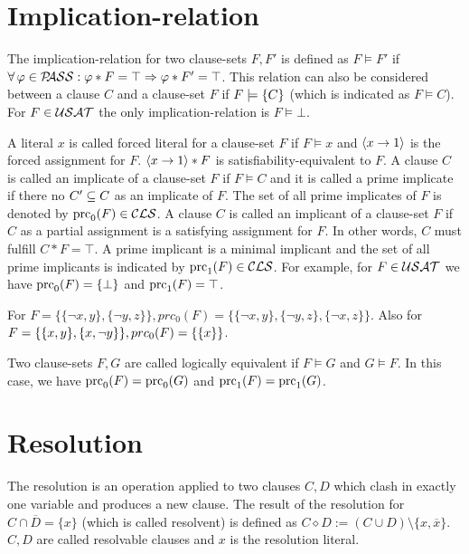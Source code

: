 \documentclass[]{book}
\begin{document}
\section{Implication-relation}
\label{sec:imprel}

The implication-relation for two clause-sets $F, F'$ is defined as $F \models F'$ if $\forall\, \varphi \in \mathcal{P\hspace{-0.32em}ASS} : \varphi * F = \top \Rightarrow \varphi * F' = \top$. This relation can also be considered between a clause $C$ and a clause-set $F$ if $F \models \{ C \}$ (which is indicated as $F \models C$). For  $F \in \mathcal{USAT}$ the only implication-relation is $F \models \bot$. 

A literal $x$ is called forced literal for a clause-set $F$ if $F \models x$ and $\langle x \rightarrow 1 \rangle$ is the forced assignment for $F$. $\langle x \rightarrow 1 \rangle * F$ is satisfiability-equivalent to $F$. A clause $C$ is called an implicate of a clause-set $F$ if $F \models C$ and it is called a prime implicate if there no $ C' \subseteq C$ as an implicate of $F$. The set of all prime implicates of $F$ is denoted by $\operatorname{prc}_0(F) \in \mathcal{CLS}$. A clause $C$ is called an implicant of a clause-set $F$ if $C$ as a partial assignment is a satisfying assignment for $F$. In other words, $C$ must fulfill $C * F=\top$. A prime implicant is a minimal implicant and the set of all prime implicants is indicated by $\operatorname{prc}_1(F) \in \mathcal{CLS}$. For example, for $F \in \mathcal{USAT}$ we have $\operatorname{prc}_0(F) = \{ \bot \}$ and $\operatorname{prc}_1(F) = \top$.

\begin{examp}\label{exp:bbb}
For $F = \{\{ \neg x, y\} , \{ \neg y, z\}\}, prc_0(F) = \{\{\neg x, y\} , \{\neg y, z\} , \{\neg x, z\}\}$. Also for $F = \{ \{ x, y \} , \{ x,\neg y \} \}, prc_0(F) = \{ \{ x \} \}$.
\end{examp}

Two clause-sets $F, G$ are called logically equivalent if $F \models G$ and $G \models F$. In this case, we have $\operatorname{prc}_0(F) = \operatorname{prc}_0(G)$ and $\operatorname{prc}_1(F) = \operatorname{prc}_1(G)$.

\section{Resolution}
\label{sec:Resolution}

The resolution is an operation applied to two clauses $C,D$ which clash in exactly one variable and produces a new clause. The result of the resolution for $C \cap \overline D = \{ x \}$ (which is called resolvent) is defined as $C \diamond D := (C \cup D) \setminus \{x, \overline x\} $. $C,D$ are called resolvable clauses and $x$ is the resolution literal.
\end{document}
